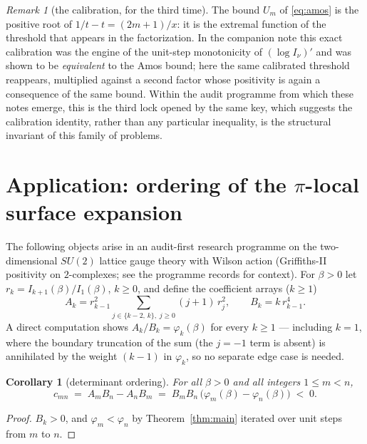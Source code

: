 \documentclass[11pt]{article}
\newtheorem{corollary}[theorem]{Corollary}
\theoremstyle{remark}
\newtheorem{remark}[theorem]{Remark}
\begin{document}
\begin{remark}[the calibration, for the third time]
\label{rem:third}
The bound $U_m$ of \eqref{eq:amos} is the positive root of
$1/t - t = (2m+1)/x$: it is the extremal function of the threshold
that appears in the factorization. In the companion note
\cite{Companion} this exact calibration was the engine of the
unit-step monotonicity of $(\log I_\nu)'$ and was shown to be
\emph{equivalent} to the Amos bound; here the same calibrated
threshold reappears, multiplied against a second factor whose
positivity is again a consequence of the same bound. Within the
audit programme from which these notes emerge, this is the third
lock opened by the same key, which suggests the calibration
identity, rather than any particular inequality, is the structural
invariant of this family of problems.
\end{remark}

\section{Application: ordering of the $\pi$-local surface expansion}
\label{sec:app}

The following objects arise in an audit-first research programme on
the two-dimensional $SU(2)$ lattice gauge theory with Wilson action
(Griffiths-II positivity on $2$-complexes; see the programme records
\cite{MasterMap} for context). For $\beta > 0$ let
$r_k = I_{k+1}(\beta)/I_1(\beta)$, $k \ge 0$, and define the
coefficient arrays ($k \ge 1$)
\[
A_k = r_{k-1}^2 \!\!\sum_{j \in \{k-2,\,k\},\; j \ge 0}\!\! (j+1)\, r_j^2,
\qquad
B_k = k\, r_{k-1}^4 .
\]
A direct computation shows $A_k/B_k = \varphi_k(\beta)$ for every
$k \ge 1$ --- including $k = 1$, where the boundary truncation of the
sum (the $j = -1$ term is absent) is annihilated by the weight
$(k-1)$ in $\varphi_k$, so no separate edge case is needed.

\begin{corollary}[determinant ordering]
\label{cor:order}
For all $\beta > 0$ and all integers $1 \le m < n$,
\[
c_{mn} \;=\; A_m B_n - A_n B_m \;=\;
B_m B_n\,\bigl(\varphi_m(\beta) - \varphi_n(\beta)\bigr) \;<\; 0 .
\]
\end{corollary}

\begin{proof}
$B_k > 0$, and $\varphi_m < \varphi_n$ by Theorem~\ref{thm:main}
iterated over unit steps from $m$ to $n$.
\end{proof}
\end{document}

